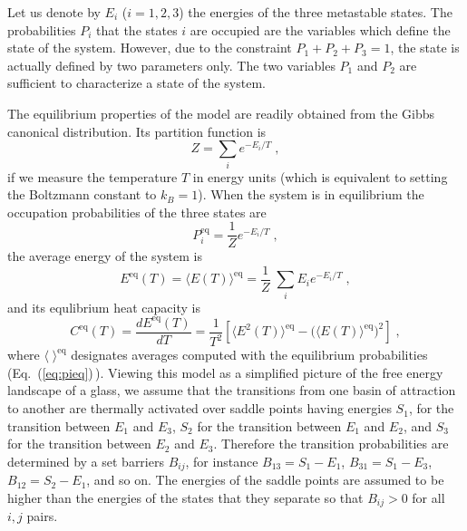 \documentclass[pre,a4paper,twocolumn,superscriptaddress,%
floatfix]{revtex4}
\begin{document}
Let us denote by $E_i$ ($i = 1,2,3$) the energies of the three metastable
states.  The probabilities $P_i$ that the states $i$ are occupied are the
variables which define the state of the system. However, due to the constraint
$P_1 + P_2 + P_3 = 1$, the state is actually defined by two parameters
only. The two variables $P_1$ and $P_2$ are sufficient to characterize a
state of the system.

The equilibrium properties of the model are readily obtained from the
Gibbs canonical distribution. Its partition function is 
\begin{equation}
  \label{eq:z}
  Z = \sum_i e^{-E_i/T} \; ,
\end{equation}
if we measure the temperature $T$ in energy units (which is equivalent to
setting the Boltzmann constant to $k_B = 1$). When the system is in
equilibrium the occupation probabilities of the three states are 
\begin{equation}
  \label{eq:pieq}
  P_i^{\mathrm{eq}} = \frac{1}{Z} e^{-E_i/T} \; ,
\end{equation}
the average energy of the system is
\begin{equation}
  \label{eq:emoyeq}
  E^{\mathrm{eq}}(T) =
  \langle E(T) \rangle^{\mathrm{eq}} = \frac{1}{Z} \; \sum_i E_i e^{-E_i/T} \; ,
\end{equation}
and its equlibrium heat capacity is
\begin{equation}
  \label{eq:ceq}
  C^{\mathrm{eq}}(T) = \frac{d E^{\mathrm{eq}}(T)}{d T} =
  \frac{1}{T^2} \left[ \langle E^2(T) \rangle^{\mathrm{eq}}
    - \Big(\langle E(T) \rangle^{\mathrm{eq}}\Big)^2\right]
  \; ,
\end{equation}
where $\langle \; \rangle^{\mathrm{eq}} $ designates averages computed with
the equilibrium probabilities (Eq.~(\ref{eq:pieq})\,).
Viewing
this model as a simplified picture of the free energy landscape of a glass, we
assume that the transitions from one basin of attraction to another are
thermally 
activated over saddle points having energies $S_1$, for the transition between
$E_1$ and $E_3$, $S_2$ for the transition between $E_1$ and $E_2$, and $S_3$
for the transition between $E_2$ and $E_3$. 
Therefore the transition
probabilities are determined by a  set barriers $B_{ij}$,
for instance 
$B_{13} = S_1 - E_1$, $B_{31} = S_1 - E_3$, $B_{12} = S_2 - E_1$, and so on.
The energies of the saddle points
are assumed to be higher than the energies of the states that they separate so
that $B_{ij} >0$ for all $i,j$ pairs.
\end{document}
